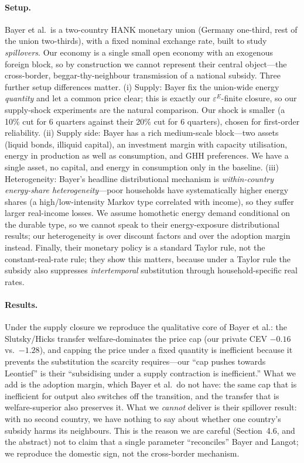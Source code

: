 \documentclass[11pt,a4paper]{article}
\begin{document}
\paragraph{Setup.} Bayer et al.\ is a two-country HANK monetary union (Germany
one-third, rest of the union two-thirds), with a fixed nominal exchange rate,
built to study \emph{spillovers}. Our economy is a single small open economy
with an exogenous foreign block, so by construction we cannot represent their
central object---the cross-border, beggar-thy-neighbour transmission of a
national subsidy. Three further setup differences matter. (i) Supply: Bayer
fix the union-wide energy \emph{quantity} and let a common price clear; this is
exactly our $\varepsilon^E$-finite closure, so our supply-shock experiments are
the natural comparison. Our shock is smaller (a 10\% cut for 6 quarters against
their 20\% cut for 6 quarters), chosen for first-order reliability. (ii) Supply
side: Bayer has a rich medium-scale block---two assets (liquid bonds, illiquid
capital), an investment margin with capacity utilisation, energy in production
as well as consumption, and GHH preferences. We have a single asset, no
capital, and energy in consumption only in the baseline. (iii) Heterogeneity:
Bayer's headline distributional mechanism is \emph{within-country
energy-share heterogeneity}---poor households have systematically higher energy
shares (a high/low-intensity Markov type correlated with income), so they
suffer larger real-income losses. We assume homothetic energy demand
conditional on the durable type, so we cannot speak to their energy-exposure
distributional results; our heterogeneity is over discount factors and over the
adoption margin instead. Finally, their monetary policy is a standard Taylor
rule, not the constant-real-rate rule; they show this matters, because under a
Taylor rule the subsidy also suppresses \emph{intertemporal} substitution
through household-specific real rates.

\paragraph{Results.} Under the supply closure we reproduce the qualitative
core of Bayer et al.: the Slutsky/Hicks transfer welfare-dominates the price
cap (our private CEV $-0.16$ vs.\ $-1.28$), and capping the price under a fixed
quantity is inefficient because it prevents the substitution the scarcity
requires---our ``cap pushes towards Leontief'' is their ``subsidising under a
supply contraction is inefficient.'' What we add is the adoption margin, which
Bayer et al.\ do not have: the same cap that is inefficient for output also
switches off the transition, and the transfer that is welfare-superior also
preserves it. What we \emph{cannot} deliver is their spillover result: with no
second country, we have nothing to say about whether one country's subsidy
harms its neighbours. This is the reason we are careful (Section~4.6, and the
abstract) not to claim that a single parameter ``reconciles'' Bayer and Langot;
we reproduce the domestic sign, not the cross-border mechanism.
\end{document}
